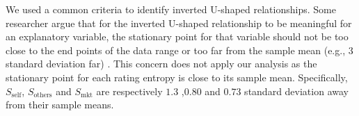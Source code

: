 \documentclass[msom,blindrev]{informs3}
\begin{document}
	
	We used a common criteria to identify inverted U-shaped relationships.  Some researcher argue that for the inverted U-shaped relationship to be meaningful for an explanatory variable, the stationary point for that variable should not be too close to the end points of the data range or too far from the sample mean (e.g., 3 standard deviation far) \cite{lind2010or}. This concern does not apply our analysis as the stationary point for each rating entropy is close to its sample mean. Specifically, $S_{\text{self}}$, $S_{\text{others}}$ and $S_{\text{mkt}}$ are respectively $1.3$ ,$0.80$ and  $0.73$  standard deviation away from their sample means.
	
	
	
	
	
	
	
	
	
\end{document}
